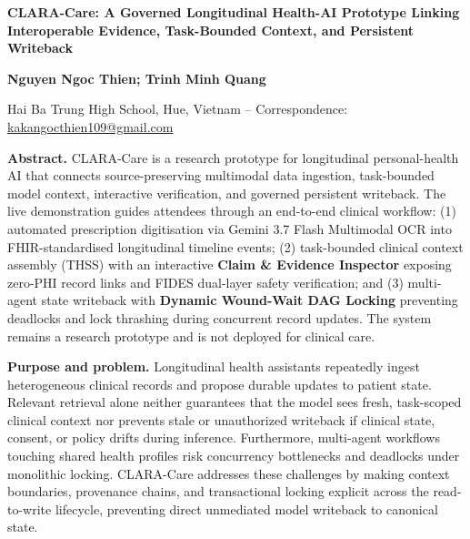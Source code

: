 \documentclass[10pt,letterpaper]{article}
\begin{document}
\begin{center}
{\fontsize{12}{13}\selectfont\bfseries CLARA-Care: A Governed Longitudinal Health-AI Prototype Linking Interoperable Evidence, Task-Bounded Context, and Persistent Writeback}\par
\vspace{2pt}
{\bfseries Nguyen Ngoc Thien; Trinh Minh Quang}\par
Hai Ba Trung High School, Hue, Vietnam -- Correspondence: \href{mailto:kakangocthien109@gmail.com}{kakangocthien109@gmail.com}
\end{center}
\fontsize{9.1}{9.9}\selectfont

\textbf{Abstract.} CLARA-Care is a research prototype for longitudinal personal-health AI that connects source-preserving multimodal data ingestion, task-bounded model context, interactive verification, and governed persistent writeback. The live demonstration guides attendees through an end-to-end clinical workflow: (1) automated prescription digitisation via Gemini 3.7 Flash Multimodal OCR into FHIR-standardised longitudinal timeline events; (2) task-bounded clinical context assembly (THSS) with an interactive \textbf{Claim \& Evidence Inspector} exposing zero-PHI record links and FIDES dual-layer safety verification; and (3) multi-agent state writeback with \textbf{Dynamic Wound-Wait DAG Locking} preventing deadlocks and lock thrashing during concurrent record updates. The system remains a research prototype and is not deployed for clinical care.

\textbf{Purpose and problem.} Longitudinal health assistants repeatedly ingest heterogeneous clinical records and propose durable updates to patient state. Relevant retrieval alone neither guarantees that the model sees fresh, task-scoped clinical context nor prevents stale or unauthorized writeback if clinical state, consent, or policy drifts during inference. Furthermore, multi-agent workflows touching shared health profiles risk concurrency bottlenecks and deadlocks under monolithic locking. CLARA-Care addresses these challenges by making context boundaries, provenance chains, and transactional locking explicit across the read-to-write lifecycle, preventing direct unmediated model writeback to canonical state.
\end{document}
